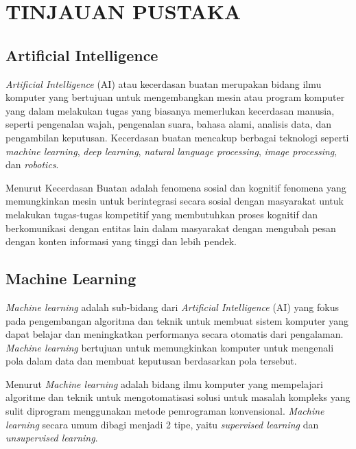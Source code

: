 \chapter{TINJAUAN PUSTAKA}

\section{Artificial Intelligence}
\textit{Artificial Intelligence} (AI) atau kecerdasan buatan merupakan bidang ilmu komputer yang bertujuan untuk mengembangkan mesin atau program komputer yang dalam melakukan tugas yang biasanya memerlukan kecerdasan manusia, seperti pengenalan wajah, pengenalan suara, bahasa alami, analisis data, dan pengambilan keputusan. Kecerdasan buatan mencakup berbagai teknologi seperti \textit{machine learning}, \textit{deep learning}, \textit{natural language processing}, \textit{image processing}, dan \textit{robotics}.

Menurut \cite{abbas2021} Kecerdasan Buatan adalah fenomena sosial dan kognitif fenomena yang memungkinkan mesin untuk berintegrasi secara sosial dengan masyarakat untuk melakukan tugas-tugas kompetitif yang membutuhkan proses kognitif dan berkomunikasi dengan entitas lain dalam masyarakat dengan mengubah pesan dengan konten informasi yang tinggi dan lebih pendek.

\section{Machine Learning}
\textit{Machine learning} adalah sub-bidang dari \textit{Artificial Intelligence} (AI) yang fokus pada pengembangan algoritma dan teknik untuk membuat sistem komputer yang dapat belajar dan meningkatkan performanya secara otomatis dari pengalaman. \textit{Machine learning} bertujuan untuk memungkinkan komputer untuk mengenali pola dalam data dan membuat keputusan berdasarkan pola tersebut.

Menurut \cite{rebala2019} \textit{Machine learning} adalah bidang ilmu komputer yang mempelajari algoritme dan teknik untuk mengotomatisasi solusi untuk masalah kompleks yang sulit diprogram menggunakan metode pemrograman konvensional. \textit{Machine learning} secara umum dibagi menjadi 2 tipe, yaitu \textit{supervised learning} dan \textit{unsupervised learning}.

